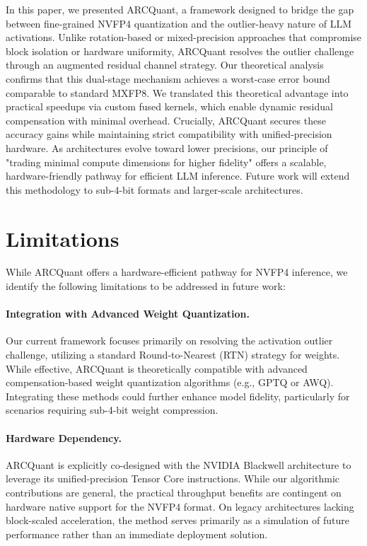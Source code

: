 \documentclass[11pt]{article}
\begin{document}
In this paper, we presented ARCQuant, a framework designed to bridge the gap between fine-grained NVFP4 quantization and the outlier-heavy nature of LLM activations. Unlike rotation-based or mixed-precision approaches that compromise block isolation or hardware uniformity, ARCQuant resolves the outlier challenge through an augmented residual channel strategy. Our theoretical analysis confirms that this dual-stage mechanism achieves a worst-case error bound comparable to standard MXFP8. We translated this theoretical advantage into practical speedups via custom fused kernels, which enable dynamic residual compensation with minimal overhead. Crucially, ARCQuant secures these accuracy gains while maintaining strict compatibility with unified-precision hardware. As architectures evolve toward lower precisions, our principle of "trading minimal compute dimensions for higher fidelity" offers a scalable, hardware-friendly pathway for efficient LLM inference. Future work will extend this methodology to sub-4-bit formats and larger-scale architectures.

\section*{Limitations}
\label{sec:limitations}

While ARCQuant offers a hardware-efficient pathway for NVFP4 inference, we identify the following limitations to be addressed in future work:

\paragraph{Integration with Advanced Weight Quantization.}
Our current framework focuses primarily on resolving the activation outlier challenge, utilizing a standard Round-to-Nearest (RTN) strategy for weights. While effective, ARCQuant is theoretically compatible with advanced compensation-based weight quantization algorithms (e.g., GPTQ or AWQ). Integrating these methods could further enhance model fidelity, particularly for scenarios requiring sub-4-bit weight compression.

\paragraph{Hardware Dependency.}
ARCQuant is explicitly co-designed with the NVIDIA Blackwell architecture to leverage its unified-precision Tensor Core instructions. While our algorithmic contributions are general, the practical throughput benefits are contingent on hardware native support for the NVFP4 format. On legacy architectures lacking block-scaled acceleration, the method serves primarily as a simulation of future performance rather than an immediate deployment solution.
\end{document}
